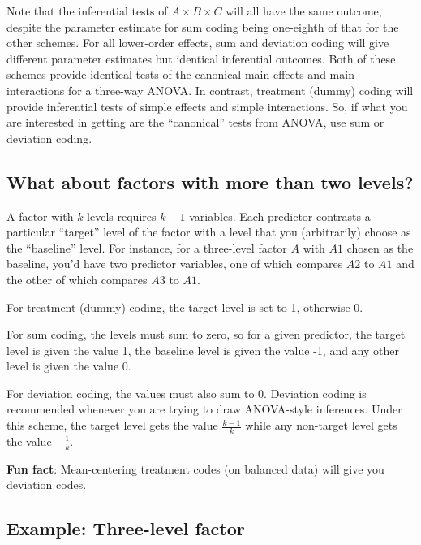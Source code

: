 \documentclass[]{book}
\begin{document}
Note that the inferential tests of \(A \times B \times C\) will all have the same outcome, despite the parameter estimate for sum coding being one-eighth of that for the other schemes. For all lower-order effects, sum and deviation coding will give different parameter estimates but identical inferential outcomes. Both of these schemes provide identical tests of the canonical main effects and main interactions for a three-way ANOVA. In contrast, treatment (dummy) coding will provide inferential tests of simple effects and simple interactions. So, if what you are interested in getting are the ``canonical'' tests from ANOVA, use sum or deviation coding.

\hypertarget{what-about-factors-with-more-than-two-levels}{%
\subsection{What about factors with more than two levels?}\label{what-about-factors-with-more-than-two-levels}}

A factor with \(k\) levels requires \(k-1\) variables. Each predictor contrasts a particular ``target'' level of the factor with a level that you (arbitrarily) choose as the ``baseline'' level. For instance, for a three-level factor \(A\) with \(A1\) chosen as the baseline, you'd have two predictor variables, one of which compares \(A2\) to \(A1\) and the other of which compares \(A3\) to \(A1\).

For treatment (dummy) coding, the target level is set to 1, otherwise 0.

For sum coding, the levels must sum to zero, so for a given predictor, the target level is given the value 1, the baseline level is given the value -1, and any other level is given the value 0.

For deviation coding, the values must also sum to 0. Deviation coding is recommended whenever you are trying to draw ANOVA-style inferences. Under this scheme, the target level gets the value \(\frac{k-1}{k}\) while any non-target level gets the value \(-\frac{1}{k}\).

\textbf{Fun fact}: Mean-centering treatment codes (on balanced data) will give you deviation codes.

\hypertarget{example-three-level-factor}{%
\subsection{Example: Three-level factor}\label{example-three-level-factor}}
\end{document}
